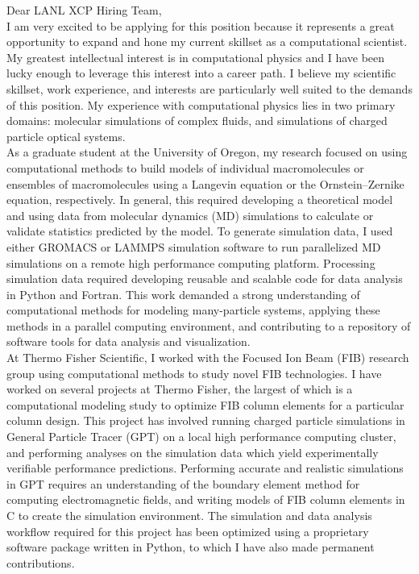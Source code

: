 \documentclass[]{letter}
\begin{document}

Dear LANL XCP Hiring Team, \\

I am very excited to be applying for this position because it represents a great opportunity to expand and hone my current skillset as a computational scientist. My greatest intellectual interest is in computational physics and I have been lucky enough to leverage this interest into a career path. I believe my scientific skillset, work experience, and interests are particularly well suited to the demands of this position. My experience with computational physics lies in two primary domains: molecular simulations of complex fluids, and simulations of charged particle optical systems. \\

As a graduate student at the University of Oregon, my research focused on using computational methods to build models of individual macromolecules or ensembles of macromolecules using a Langevin equation or the Ornstein–Zernike equation, respectively. In general, this required developing a theoretical model and using data from molecular dynamics (MD) simulations to calculate or validate statistics predicted by the model. To generate simulation data, I used either GROMACS or LAMMPS simulation software to run parallelized MD simulations on a remote high performance computing platform. Processing simulation data required developing reusable and scalable code for data analysis in Python and Fortran. This work demanded a strong understanding of computational methods for modeling many-particle systems, applying these methods in a parallel computing environment, and contributing to a repository of software tools for data analysis and visualization. \\

At Thermo Fisher Scientific, I worked with the Focused Ion Beam (FIB) research group using computational methods to study novel FIB technologies. I have worked on several projects at Thermo Fisher, the largest of which is a computational modeling study to optimize FIB column elements for a particular column design. This project has involved running charged particle simulations in General Particle Tracer (GPT) on a local high performance computing cluster, and performing analyses on the simulation data which yield experimentally verifiable performance predictions. Performing accurate and realistic simulations in GPT requires an understanding of the boundary element method for computing electromagnetic fields, and writing models of FIB column elements in C to create the simulation environment. The simulation and data analysis workflow required for this project has been optimized using a proprietary software package written in Python, to which I have also made permanent contributions. \\
\end{document}

